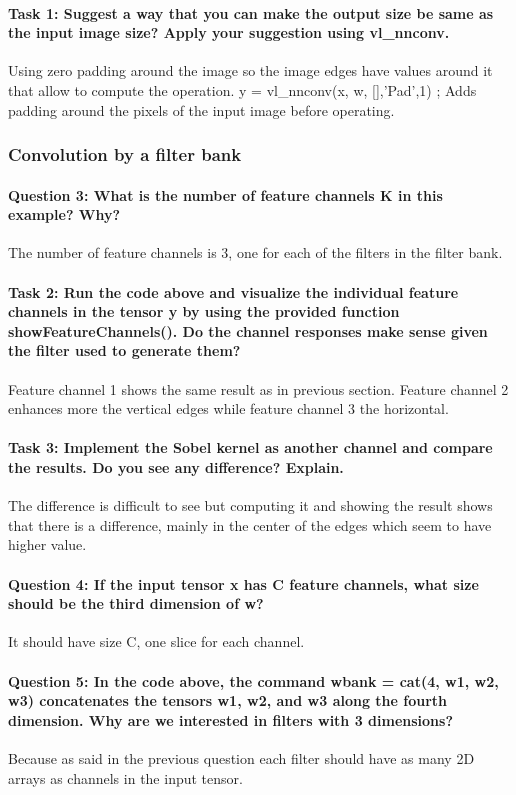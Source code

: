 \documentclass[12pt]{article}
\begin{document}
\paragraph{Task 1: Suggest a way that you can make the output size be same as the input image size? Apply your suggestion using vl\_nnconv.}
Using zero padding around the image so the image edges have values around it that allow to compute the operation. y = vl\_nnconv(x, w, [],'Pad',1) ; Adds padding around the pixels of the input image before operating.

\subsubsection{Convolution by a filter bank}
\paragraph{Question 3: What is the number of feature channels K in this example? Why?} The number of feature channels is 3, one for each of the filters in the filter bank.
\paragraph{Task 2: Run the code above and visualize the individual feature channels in the tensor y by using the provided function showFeatureChannels(). Do the channel responses make sense given the
filter used to generate them?} Feature channel 1 shows the same result as in previous section. Feature channel 2 enhances more the vertical edges while feature channel 3 the horizontal.
\paragraph{Task 3: Implement the Sobel kernel as another channel and compare the results. Do you see any difference? Explain.} The difference is difficult to see but computing it and showing the result shows that there is a difference, mainly in the center of the edges which seem to have higher value.
\paragraph{Question 4: If the input tensor x has C feature channels, what size should be the third dimension of w?} It should have size C, one slice for each channel.
\paragraph{Question 5: In the code above, the command wbank = cat(4, w1, w2, w3) concatenates the tensors w1, w2, and w3 along the fourth dimension. Why are we interested in filters with 3 dimensions?} Because as said in the previous question each filter should have as many 2D arrays as channels in the input tensor.
\end{document}
